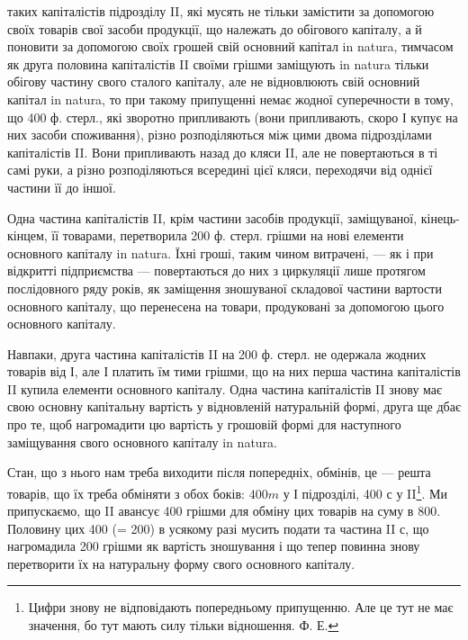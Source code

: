 \parcont{}  %
таких капіталістів підрозділу II, які мусять не тільки замістити за допомогою
своїх товарів свої засоби продукції, що належать до обігового
капіталу, а й поновити за допомогою своїх грошей свій основний
капітал in natura, тимчасом як друга половина капіталістів II своїми
грішми заміщують  in natura тільки обігову частину свого сталого капіталу,
але не відновлюють свій основний капітал  in natura, то при такому
припущенні немає жодної суперечности в тому, що 400 ф. стерл., які зворотно
припливають (вони припливають, скоро І купує на них засоби
споживання), різно розподіляються між цими двома підрозділами капіталістів
II. Вони припливають назад до кляси II, але не повертаються в ті
самі руки, а різно розподіляються всередині цієї кляси, переходячи від
однієї частини її до іншої.

Одна частина капіталістів II, крім частини засобів продукції, заміщуваної,
кінець-кінцем, її товарами, перетворила 200 ф. стерл. грішми на
нові елементи основного капіталу  in natura. Їхні гроші, таким чином
витрачені, — як і при відкритті підприємства — повертаються до них з циркуляції
лише протягом послідовного ряду років, як заміщення зношуваної
складової частини вартости основного капіталу, що перенесена на товари,
продуковані за допомогою цього основного капіталу.

Навпаки, друга частина капіталістів II на 200 ф. стерл. не одержала
жодних товарів від І, але І платить їм тими грішми, що на них перша
частина капіталістів II купила елементи основного капіталу. Одна частина
капіталістів II знову має свою основну капітальну вартість у відновленій
натуральній формі, друга ще дбає про те, щоб нагромадити цю вартість
у грошовій формі для наступного заміщування свого основного капіталу
in natura.

Стан, що з нього нам треба виходити після попередніх, обмінів, це —
решта товарів, що їх треба обміняти з обох боків: $400 m$ у І підрозділі, 400 с
у II\footnote{
Цифри знову не відповідають попередньому припущенню. Але це тут не має
значення, бо тут мають силу тільки відношення. Ф. Е.
}. Ми припускаємо, що II авансує 400 грішми для обміну цих товарів
на суму в 800. Половину цих 400 (= 200) в усякому разі мусить подати
та частина II с, що нагромадила 200 грішми як вартість зношування
і що тепер повинна знову перетворити їх на натуральну форму свого
основного капіталу.


